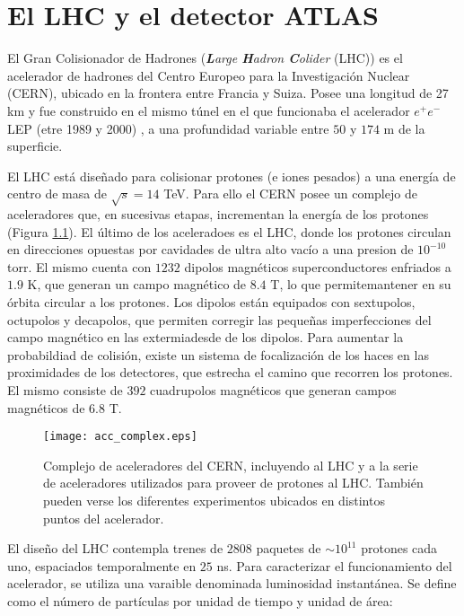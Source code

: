 \chapter{El LHC y el detector ATLAS}


El Gran Colisionador de Hadrones (\textit{\textbf{L}arge \textbf{H}adron \textbf{C}olider} (LHC)) \cite{Evans:1129806} es el acelerador de hadrones del Centro Europeo para la Investigación Nuclear (CERN), ubicado en la frontera entre Francia y Suiza. Posee una longitud de 27 km y fue construido en el mismo túnel en el que funcionaba el acelerador $e^{+}e^{-}$ LEP (etre 1989 y 2000) \cite{LEPbook}, a una profundidad variable entre $50$ y $174$ m de la superficie.

El LHC está diseñado para colisionar protones (e iones pesados) a una energía de centro de masa de $\sqrt{s}=14$ TeV. Para ello el CERN posee un complejo de aceleradores que, en sucesivas etapas, incrementan la energía de los protones (Figura \ref{acc_complex}). El último de los aceleradoes es el LHC, donde los protones circulan en direcciones opuestas por cavidades de ultra alto vacío a una presion de $10^{-10}$ torr. El mismo cuenta con $1232$ dipolos magnéticos superconductores enfriados a $1.9$ K, que generan un campo magnético de $8.4$ T, lo que permitemantener en su órbita circular a los protones. Los dipolos están equipados con sextupolos, octupolos y decapolos, que permiten corregir las pequeñas imperfecciones del campo magnético en las extermiadesde de los dipolos. Para aumentar la probabildiad de colisión, existe un sistema de focalización de los haces en las proximidades de los detectores, que estrecha el camino que recorren los protones. El mismo consiste de $392$ cuadrupolos magnéticos que generan campos magnéticos de $6.8$ T. 

\begin{figure}[ht]
\centering
\texttt{[image: acc\_complex.eps]}
\caption{Complejo de aceleradores del CERN, incluyendo al LHC y a la serie de aceleradores utilizados para proveer de protones al LHC. También pueden verse los diferentes experimentos ubicados en distintos puntos del acelerador.}
\label{acc_complex}
\end{figure}

El diseño del LHC contempla trenes de $2808$ paquetes de $\sim 10^{11}$ protones cada uno, espaciados temporalmente en $25$ ns. Para caracterizar el funcionamiento del acelerador, se utiliza una varaible denominada luminosidad instantánea. Se define como el número de partículas por unidad de tiempo y unidad de área:

